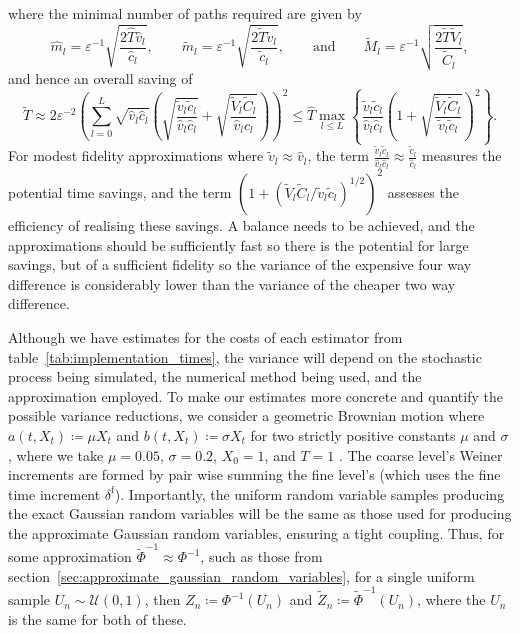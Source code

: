 \documentclass[manuscript,review]{acmart}
\begin{document}
where the minimal number of paths required are given by
\begin{equation*}
\widehat{m}_l = \varepsilon^{-1} \sqrt{\dfrac{2\widehat{T}\hat{v}_l}{\hat{c}_l}},
\qquad 
\widetilde{m}_l  = \varepsilon^{-1} \sqrt{\dfrac{2\widetilde{T} \tilde{v}_l}{\tilde{c}_l}}, 
\qquad 
\text{and}
\qquad 
\widetilde{M}_l  = \varepsilon^{-1} \sqrt{\dfrac{2\widetilde{T} \widetilde{V}_l}{\widetilde{C}_l}},
\end{equation*}
and hence an overall saving of
\begin{equation*}
\widetilde{T} 
\approx 2\varepsilon^{-2} \left(\sum_{l=0}^L \sqrt{\hat{v}_l \hat{c}_l} \left( \sqrt{\dfrac{\tilde{v}_l\tilde{c}_l}{\hat{v}_l\hat{c}_l}} + \sqrt{\dfrac{\widetilde{V}_l \widetilde{C}_l}{\hat{v}_l \hat{c}_l}}\right)\right)^2 
\leq \widehat{T} \max_{l \leq L} \left\{ \dfrac{\tilde{v}_l\tilde{c}_l}{\hat{v}_l\hat{c}_l} \left(1 + \sqrt{\dfrac{\widetilde{V}_l \widetilde{C}_l}{\tilde{v}_l \tilde{c}_l}}\right)^2\right\}.
\end{equation*}
For modest fidelity approximations where $ \tilde{v}_l \approx \hat{v}_l $, the term $ \tfrac{\tilde{v}_l\tilde{c}_l}{\hat{v}_l\hat{c}_l} \approx \tfrac{\tilde{c}_l}{\hat{c}_l}$ measures the potential time savings, and the term $ (1 + (\widetilde{V}_l \widetilde{C}_l / \tilde{v}_l \tilde{c}_l)^{1/2})^2 $ assesses the efficiency of realising these savings. A balance needs to be achieved, and the approximations should be sufficiently fast so there is the potential for large savings, but of a sufficient fidelity so the variance of the expensive four way difference is considerably lower than the variance of the cheaper two way difference.

Although we have estimates for the costs of each estimator from table~\ref{tab:implementation_times}, the variance will depend on the stochastic process being simulated, the numerical method being used, and the approximation employed. To make our estimates more concrete and quantify the possible variance reductions, we consider a geometric Brownian motion where $ a(t, X_t) \coloneqq \mu X_t $ and $ b(t, X_t) \coloneqq \sigma X_t $ for two strictly positive constants $ \mu $ and $ \sigma $, where we take $ \mu = 0.05 $, $ \sigma = 0.2 $, $ X_0 = 1 $, and $ T = 1 $ \citep[6.1]{giles2008multilevel}. The coarse level's Weiner increments are formed by pair wise summing the fine level's (which uses the fine time increment $ \delta^{\mathrm{f}} $). Importantly, the uniform random variable samples producing the exact Gaussian random variables will be the same as those used for producing the approximate Gaussian random variables, ensuring a tight coupling. Thus, for some approximation $ \widetilde{\Phi}^{-1} \approx \Phi^{-1} $, such as those from section~\ref{sec:approximate_gaussian_random_variables}, for a single uniform sample $ U_n \sim \mathcal{U}(0, 1) $, then $ Z_n \coloneqq \Phi^{-1}(U_n) $ and $ \widetilde{Z}_n \coloneqq \widetilde{\Phi}^{-1}(U_n) $, where the $ U_n $ is the same for both of these.
\end{document}
